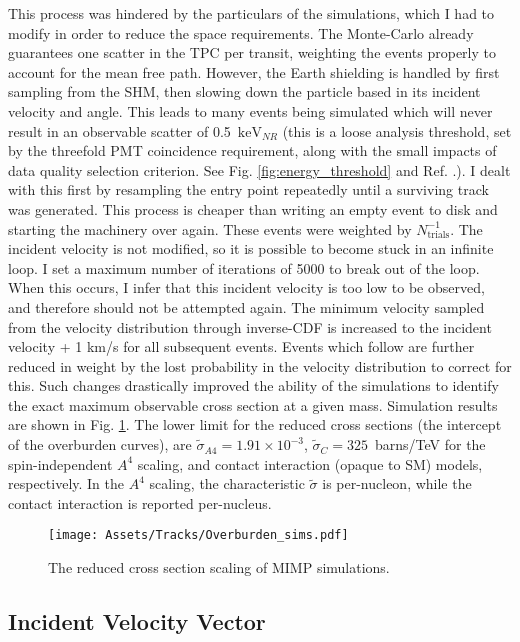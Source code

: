 This process was hindered by the particulars of the simulations, which I had to modify in order to reduce the space requirements.
The Monte-Carlo already guarantees one scatter in the TPC per transit, weighting the events properly to account for the mean free path.
However, the Earth shielding is handled by first sampling from the SHM, then slowing down the particle based in its incident velocity and angle.
This leads to many events being simulated which will never result in an observable scatter of 0.5~$\mathrm{keV}_{NR}$ (this is a loose analysis threshold, set by the threefold PMT coincidence requirement, along with the small impacts of data quality selection criterion.
See Fig. \ref{fig:energy_threshold} and Ref. \cite{aalbers_first_2022}.).
I dealt with this first by resampling the entry point repeatedly until a surviving track was generated. 
This process is cheaper than writing an empty event to disk and starting the machinery over again.
These events were weighted by $N_{\text{trials}}^{-1}$.
The incident velocity is not modified, so it is possible to become stuck in an infinite loop.
I set a maximum number of iterations of 5000 to break out of the loop.
When this occurs, I infer that this incident velocity is too low to be observed, and therefore should not be attempted again.
The minimum velocity sampled from the velocity distribution through inverse-CDF is increased to the incident velocity + 1 km/s for all subsequent events.
Events which follow are further reduced in weight by the lost probability in the velocity distribution to correct for this.
Such changes drastically improved the ability of the simulations to identify the exact maximum observable cross section at a given mass.
Simulation results are shown in Fig. \ref{fig:sigma_scaling_overburden}.
The lower limit for the reduced cross sections (the intercept of the overburden curves), are $\tilde \sigma_{A4} = 1.91\times10^{-3}$, $\tilde \sigma_{C} = 325$~barns/TeV for the spin-independent $A^4$ scaling, and contact interaction (opaque to SM) models, respectively.
In the $A^4$ scaling, the characteristic $\tilde \sigma$ is per-nucleon, while the contact interaction is reported per-nucleus.

\begin{figure}
    \centering
    \texttt{[image: Assets/Tracks/Overburden\_sims.pdf]}
    \caption{The reduced cross section scaling of MIMP simulations.}
    \label{fig:sigma_scaling_overburden}
\end{figure}

\subsection{Incident Velocity Vector}

